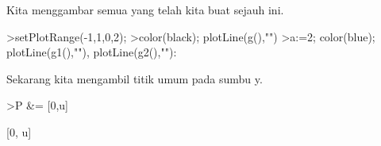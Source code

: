 \documentclass[12pt,arial,letterpaper]{book}
\begin{document}
\begin{eulercomment}
\begin{eulercomment}
\begin{eulercomment}
\begin{eulercomment}
\begin{eulercomment}
\begin{eulercomment}
\begin{eulercomment}
\begin{eulercomment}
\begin{eulercomment}
\begin{eulercomment}
\begin{eulercomment}
\begin{eulercomment}
\begin{eulercomment}
\begin{eulercomment}
\begin{eulercomment}
\begin{eulercomment}
\begin{eulercomment}
\begin{eulercomment}
\begin{eulercomment}
\begin{eulercomment}
\begin{eulercomment}
\begin{eulercomment}
\begin{eulercomment}
\begin{eulercomment}
\begin{eulercomment}
\begin{eulercomment}
\begin{eulercomment}
\begin{eulercomment}
\begin{eulercomment}
\begin{eulercomment}
\begin{euleroutput}
\end{euleroutput}
\begin{eulercomment}
Kita menggambar semua yang telah kita buat sejauh ini.
\end{eulercomment}
\begin{eulerprompt}
>setPlotRange(-1,1,0,2);
>color(black); plotLine(g(),"")
>a:=2; color(blue); plotLine(g1(),""), plotLine(g2(),""):
\end{eulerprompt}
\begin{eulercomment}
Sekarang kita mengambil titik umum pada sumbu y.
\end{eulercomment}
\begin{eulerprompt}
>P &= [0,u]
\end{eulerprompt}
\begin{euleroutput}
  
                                  [0, u]
  

\end{euleroutput}
\end{eulercomment}
\end{eulercomment}
\end{eulercomment}
\end{eulercomment}
\end{eulercomment}
\end{eulercomment}
\end{eulercomment}
\end{eulercomment}
\end{eulercomment}
\end{eulercomment}
\end{eulercomment}
\end{eulercomment}
\end{eulercomment}
\end{eulercomment}
\end{eulercomment}
\end{eulercomment}
\end{eulercomment}
\end{eulercomment}
\end{eulercomment}
\end{eulercomment}
\end{eulercomment}
\end{eulercomment}
\end{eulercomment}
\end{eulercomment}
\end{eulercomment}
\end{eulercomment}
\end{eulercomment}
\end{eulercomment}
\end{eulercomment}
\end{eulercomment}
\end{document}

